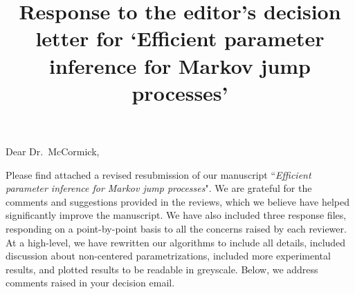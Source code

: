 \documentclass[11pt]{article}
\title{Response to the editor's decision letter for `Efficient parameter inference for Markov jump processes'}
\author{}
\date{}
\begin{document}
\maketitle

\noindent Dear Dr.\ McCormick,

Please find attached a revised resubmission of our manuscript ``{\em Efficient parameter inference for Markov jump processes}". 
We are grateful for the comments and suggestions provided in the reviews, which we believe have helped significantly improve the manuscript.
We have also included three response files, responding on a point-by-point basis to all the concerns raised by each reviewer. At a high-level, we have rewritten our algorithms to include all details, included discussion about non-centered parametrizations, included more experimental results, and plotted results to be readable in greyscale. 
Below, we address comments raised in your decision email.
\end{document}
